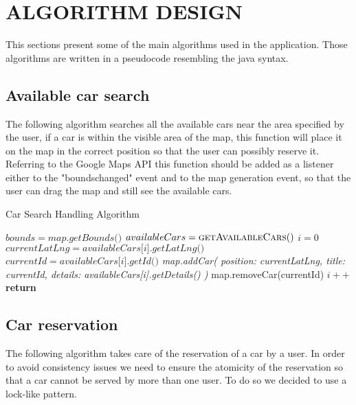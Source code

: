 \section{ALGORITHM DESIGN}

This sections present some of the main algorithms used in the application. Those algorithms are written
in a pseudocode resembling the java syntax.

\subsection{Available car search}
The following algorithm searches all the available cars near the area specified by the user, if a car
is within the visible area of the map, this function will place it on the map in the correct position
so that the user can possibly reserve it. Referring to the Google Maps API this function should be
added as a listener either to the "bounds\textunderscore changed" event and to the map generation event,
so that the user can drag the map and still see the available cars.

\begin{algorithm}
\begin{algorithmic}[1]
  \caption{\label{alg:stdreqhandler} Car Search Handling Algorithm}

    \State $ bounds = \textit{map.getBounds()} $
    \State $ availableCars = \Call {getAvailableCars} $
    \State $ i = \textit{0}$
      \State $ currentLatLng = \textit{availableCars[i].getLatLng()} $
      \State $ currentId = \textit{availableCars[i].getId()} $
        \State \textit{map.addCar(
          \State position: currentLatLng,
          \State title: currentId,
          \State details: availableCars[i].getDetails()
        \State )}
        \State map.removeCar(currentId)
      \EndIf
      \State $ i++ $
    \EndFor
    \State \textbf{return}
  \EndFunction

\end{algorithmic}
\end{algorithm}

\pagebreak

\subsection{Car reservation}
The following algorithm takes care of the reservation of a car by a user. In order to avoid consistency
issues we need to ensure the atomicity of the reservation so that a car cannot be served by more than
one user. To do so we decided to use a lock-like pattern.


